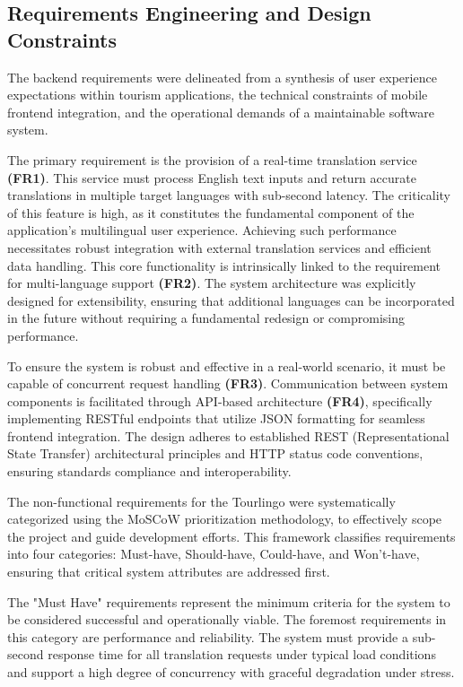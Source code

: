 \subsection{Requirements Engineering and Design Constraints}

The backend requirements were delineated from a synthesis of user experience expectations within tourism applications, the technical constraints of mobile frontend integration, and the operational demands of a maintainable software system.\cite{requirements-engineering-process}

The primary requirement is the provision of a real-time translation service \textbf{(FR1)}\cite{open-nmt}. This service must process English text inputs and return accurate translations in multiple target languages with sub-second latency. The criticality of this feature is high, as it constitutes the fundamental component of the application's multilingual user experience. Achieving such performance necessitates robust integration with external translation services and efficient data handling. This core functionality is intrinsically linked to the requirement for multi-language support \textbf{(FR2)}. The system architecture was explicitly designed for extensibility, ensuring that additional languages can be incorporated in the future without requiring a fundamental redesign or compromising performance. 

To ensure the system is robust and effective in a real-world scenario, it must be capable of concurrent request handling \textbf{(FR3)}. Communication between system components is facilitated through API-based architecture \textbf{(FR4)}, specifically implementing RESTful endpoints that utilize JSON formatting for seamless frontend integration. The design adheres to established REST (Representational State Transfer) architectural principles and HTTP status code conventions, ensuring standards compliance and interoperability\cite{RESTful}\cite{fullstacktips2023restful}.

The non-functional requirements for the Tourlingo were systematically categorized using the MoSCoW prioritization methodology\cite{productplan2019moscow}\cite{wikipedia2025moscow}, to effectively scope the project and guide development efforts. This framework classifies requirements into four categories: Must-have, Should-have, Could-have, and Won't-have, ensuring that critical system attributes are addressed first.

The "Must Have"  requirements represent the minimum criteria for the system to be considered successful and operationally viable. The foremost requirements in this category are performance and reliability. The system must provide a sub-second response time for all translation requests under typical load conditions and support a high degree of concurrency with graceful degradation under stress.

